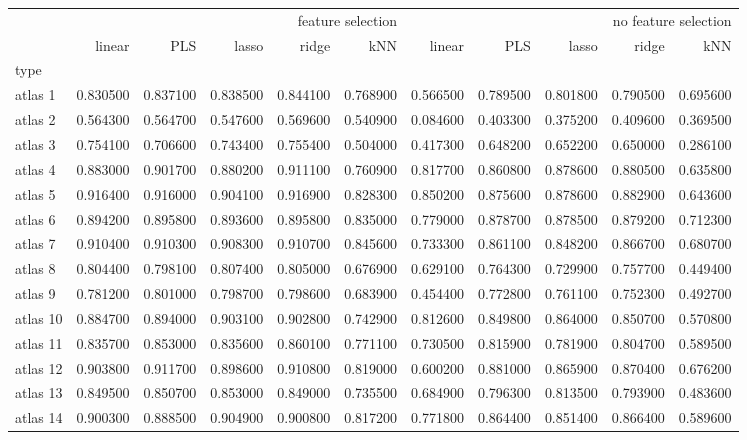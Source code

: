 \documentclass[a4paper]{article}
\begin{document}
\thispagestyle{empty}
\begin{landscape}
\begin{tabular}{lrrrrrrrrrr}
\toprule
 & \multicolumn{5}{r}{feature selection} & \multicolumn{5}{r}{no feature selection} \\
 & linear & PLS & lasso & ridge & kNN & linear & PLS & lasso & ridge & kNN \\
type &  &  &  &  &  &  &  &  &  &  \\
\midrule
atlas 1 & 0.830500 & 0.837100 & 0.838500 & 0.844100 & 0.768900 & 0.566500 & 0.789500 & 0.801800 & 0.790500 & 0.695600 \\
atlas 2 & 0.564300 & 0.564700 & 0.547600 & 0.569600 & 0.540900 & 0.084600 & 0.403300 & 0.375200 & 0.409600 & 0.369500 \\
atlas 3 & 0.754100 & 0.706600 & 0.743400 & 0.755400 & 0.504000 & 0.417300 & 0.648200 & 0.652200 & 0.650000 & 0.286100 \\
atlas 4 & 0.883000 & 0.901700 & 0.880200 & 0.911100 & 0.760900 & 0.817700 & 0.860800 & 0.878600 & 0.880500 & 0.635800 \\
atlas 5 & 0.916400 & 0.916000 & 0.904100 & 0.916900 & 0.828300 & 0.850200 & 0.875600 & 0.878600 & 0.882900 & 0.643600 \\
atlas 6 & 0.894200 & 0.895800 & 0.893600 & 0.895800 & 0.835000 & 0.779000 & 0.878700 & 0.878500 & 0.879200 & 0.712300 \\
atlas 7 & 0.910400 & 0.910300 & 0.908300 & 0.910700 & 0.845600 & 0.733300 & 0.861100 & 0.848200 & 0.866700 & 0.680700 \\
atlas 8 & 0.804400 & 0.798100 & 0.807400 & 0.805000 & 0.676900 & 0.629100 & 0.764300 & 0.729900 & 0.757700 & 0.449400 \\
atlas 9 & 0.781200 & 0.801000 & 0.798700 & 0.798600 & 0.683900 & 0.454400 & 0.772800 & 0.761100 & 0.752300 & 0.492700 \\
atlas 10 & 0.884700 & 0.894000 & 0.903100 & 0.902800 & 0.742900 & 0.812600 & 0.849800 & 0.864000 & 0.850700 & 0.570800 \\
atlas 11 & 0.835700 & 0.853000 & 0.835600 & 0.860100 & 0.771100 & 0.730500 & 0.815900 & 0.781900 & 0.804700 & 0.589500 \\
atlas 12 & 0.903800 & 0.911700 & 0.898600 & 0.910800 & 0.819000 & 0.600200 & 0.881000 & 0.865900 & 0.870400 & 0.676200 \\
atlas 13 & 0.849500 & 0.850700 & 0.853000 & 0.849000 & 0.735500 & 0.684900 & 0.796300 & 0.813500 & 0.793900 & 0.483600 \\
atlas 14 & 0.900300 & 0.888500 & 0.904900 & 0.900800 & 0.817200 & 0.771800 & 0.864400 & 0.851400 & 0.866400 & 0.589600 \\

\end{tabular}
\end{landscape}
\end{document}
